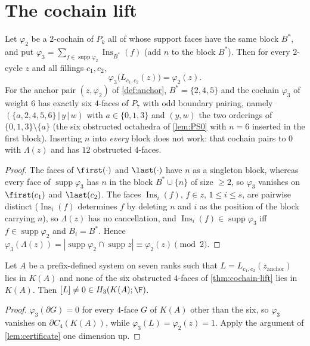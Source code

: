 \section{The cochain lift}
\begin{theorem}\label{thm:cochain-lift}
Let $\varphi_2$ be a $2$-cochain of $P_k$ all of whose support faces have the same block $B^\ast$, and put $\varphi_3=\sum_{f\in\operatorname{supp}\varphi_2}\operatorname{Ins}_{B^\ast}(f)$ (add $n$ to the block $B^\ast$). Then for every $2$-cycle $z$ and all fillings $c_1,c_2$,
\[
\varphi_3\bigl(L_{c_1,c_2}(z)\bigr)=\varphi_2(z).
\]
For the anchor pair $(z,\varphi_2)$ of \cref{def:anchor}, $B^\ast=\{2,4,5\}$ and the cochain $\varphi_3$ of weight $6$ has exactly six $4$-faces of $P_7$ with odd boundary pairing, namely $(\{a,2,4,5,6\}\,|\,y\,|\,w)$ with $a\in\{0,1,3\}$ and $(y,w)$ the two orderings of $\{0,1,3\}\setminus\{a\}$ (the six obstructed octahedra of \cref{lem:PS0} with $n=6$ inserted in the first block). Inserting $n$ into \emph{every} block does not work: that cochain pairs to $0$ with $\Lambda(z)$ and has $12$ obstructed $4$-faces.
\end{theorem}
\begin{proof}
The faces of $\first(\cdot)$ and $\last(\cdot)$ have $n$ as a singleton block, whereas every face of $\operatorname{supp}\varphi_3$ has $n$ in the block $B^\ast\cup\{n\}$ of size $\ge2$, so $\varphi_3$ vanishes on $\first(c_1)$ and $\last(c_2)$. The faces $\operatorname{Ins}_i(f)$, $f\in z$, $1\le i\le s$, are pairwise distinct ($\operatorname{Ins}_i(f)$ determines $f$ by deleting $n$ and $i$ as the position of the block carrying $n$), so $\Lambda(z)$ has no cancellation, and $\operatorname{Ins}_i(f)\in\operatorname{supp}\varphi_3$ iff $f\in\operatorname{supp}\varphi_2$ and $B_i=B^\ast$. Hence $\varphi_3(\Lambda(z))=|\operatorname{supp}\varphi_2\cap\operatorname{supp}z|\equiv\varphi_2(z)\pmod2$.
\end{proof}
\begin{corollary}\label{cor:lifted-hole}
Let $A$ be a prefix-defined system on seven ranks such that $L=L_{c_1,c_2}(z_{\mathrm{anchor}})$ lies in $K(A)$ and none of the six obstructed $4$-faces of \cref{thm:cochain-lift} lies in $K(A)$. Then $[L]\ne0\in H_3(K(A);\F)$.
\end{corollary}
\begin{proof}
$\varphi_3(\partial G)=0$ for every $4$-face $G$ of $K(A)$ other than the six, so $\varphi_3$ vanishes on $\partial C_4(K(A))$, while $\varphi_3(L)=\varphi_2(z)=1$. Apply the argument of \cref{lem:certificate} one dimension up.
\end{proof}

